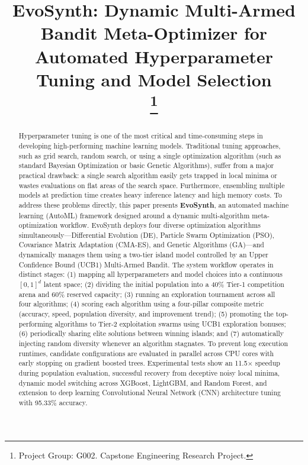 \documentclass[conference]{IEEEtran}
\begin{document}
\title{EvoSynth: Dynamic Multi-Armed Bandit Meta-Optimizer for Automated Hyperparameter Tuning and Model Selection\\
\thanks{Project Group: G002. Capstone Engineering Research Project.}
}

\author{
}

\maketitle

\begin{abstract}
Hyperparameter tuning is one of the most critical and time-consuming steps in developing high-performing machine learning models. Traditional tuning approaches, such as grid search, random search, or using a single optimization algorithm (such as standard Bayesian Optimization or basic Genetic Algorithms), suffer from a major practical drawback: a single search algorithm easily gets trapped in local minima or wastes evaluations on flat areas of the search space. Furthermore, ensembling multiple models at prediction time creates heavy inference latency and high memory costs. To address these problems directly, this paper presents \textbf{EvoSynth}, an automated machine learning (AutoML) framework designed around a dynamic multi-algorithm meta-optimization workflow. EvoSynth deploys four diverse optimization algorithms simultaneously---Differential Evolution (DE), Particle Swarm Optimization (PSO), Covariance Matrix Adaptation (CMA-ES), and Genetic Algorithms (GA)---and dynamically manages them using a two-tier island model controlled by an Upper Confidence Bound (UCB1) Multi-Armed Bandit. The system workflow operates in distinct stages: (1) mapping all hyperparameters and model choices into a continuous $[0, 1]^d$ latent space; (2) dividing the initial population into a 40\% Tier-1 competition arena and 60\% reserved capacity; (3) running an exploration tournament across all four algorithms; (4) scoring each algorithm using a four-pillar composite metric (accuracy, speed, population diversity, and improvement trend); (5) promoting the top-performing algorithms to Tier-2 exploitation swarms using UCB1 exploration bonuses; (6) periodically sharing elite solutions between winning islands; and (7) automatically injecting random diversity whenever an algorithm stagnates. To prevent long execution runtimes, candidate configurations are evaluated in parallel across CPU cores with early stopping on gradient boosted trees. Experimental tests show an 11.5$\times$ speedup during population evaluation, successful recovery from deceptive noisy local minima, dynamic model switching across XGBoost, LightGBM, and Random Forest, and extension to deep learning Convolutional Neural Network (CNN) architecture tuning with 95.33\% accuracy.
\end{abstract}
\end{document}
